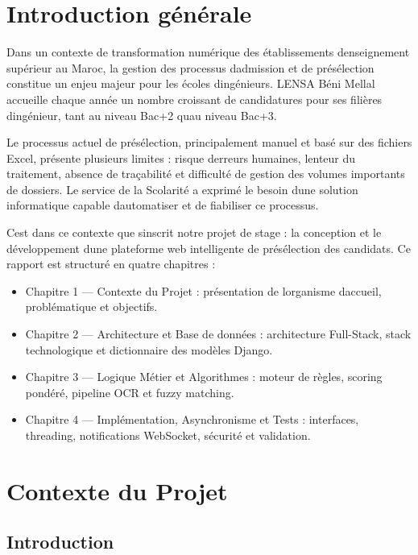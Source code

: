 \chapter{Introduction générale}

Dans un contexte de transformation numérique des établissements
d\textquotesingle enseignement supérieur au Maroc, la gestion des
processus d\textquotesingle admission et de présélection constitue un
enjeu majeur pour les écoles d\textquotesingle ingénieurs.
L\textquotesingle ENSA Béni Mellal accueille chaque année un nombre
croissant de candidatures pour ses filières d\textquotesingle ingénieur,
tant au niveau Bac+2 qu\textquotesingle au niveau Bac+3.

Le processus actuel de présélection, principalement manuel et basé sur
des fichiers Excel, présente plusieurs limites : risque
d\textquotesingle erreurs humaines, lenteur du traitement, absence de
traçabilité et difficulté de gestion des volumes importants de dossiers.
Le service de la Scolarité a exprimé le besoin d\textquotesingle une
solution informatique capable d\textquotesingle automatiser et de
fiabiliser ce processus.

C\textquotesingle est dans ce contexte que s\textquotesingle inscrit
notre projet de stage : la conception et le développement
d\textquotesingle une plateforme web intelligente de présélection des
candidats. Ce rapport est structuré en quatre chapitres :

\begin{itemize}
\item
  Chapitre 1 --- Contexte du Projet : présentation de
  l\textquotesingle organisme d\textquotesingle accueil, problématique
  et objectifs.
\item
  Chapitre 2 --- Architecture et Base de données : architecture
  Full-Stack, stack technologique et dictionnaire des modèles Django.
\item
  Chapitre 3 --- Logique Métier et Algorithmes : moteur de règles,
  scoring pondéré, pipeline OCR et fuzzy matching.
\item
  Chapitre 4 --- Implémentation, Asynchronisme et Tests : interfaces,
  threading, notifications WebSocket, sécurité et validation.
\end{itemize}

\chapter{Contexte du
Projet}

\section{Introduction}

